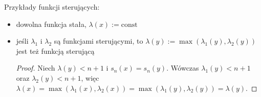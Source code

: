 \begin{note}
Przykłady funkcji sterujących:
  \begin{itemize}
    \item dowolna funkcja stała, $\lambda(x) := \mbox{const}$
    \item jeśli $\lambda_1$ i $\lambda_2$ są funkcjami sterującymi, to $\lambda(y) := \max(\lambda_1(y), \lambda_2(y))$ jest też funkcją sterującą
  \begin{proof}
    Niech $\lambda(y) < n+1$ i $s_n(x) = s_n(y)$. Wówczas $\lambda_1(y) < n+1$ oraz $\lambda_2(y) < n+1$, więc $\lambda(x) = \max(\lambda_1(x), \lambda_2(x)) = \max(\lambda_1(y), \lambda_2(y)) = \lambda(y)$.
  \end{proof}
  \end{itemize}
\end{note}


